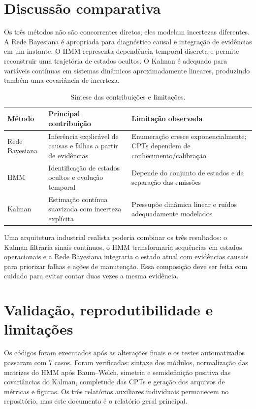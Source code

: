 \documentclass[11pt,a4paper]{article}
\begin{document}
\section{Discussão comparativa}
Os três métodos não são concorrentes diretos; eles modelam incertezas diferentes. A Rede Bayesiana é apropriada para diagnóstico causal e integração de evidências em um instante. O HMM representa dependência temporal discreta e permite reconstruir uma trajetória de estados ocultos. O Kalman é adequado para variáveis contínuas em sistemas dinâmicos aproximadamente lineares, produzindo também uma covariância de incerteza.

\begin{table}[H]\centering
\caption{Síntese das contribuições e limitações.}
\begin{tabularx}{\linewidth}{lXX}
\toprule
Método & Principal contribuição & Limitação observada\\
\midrule
Rede Bayesiana & Inferência explicável de causas e falhas a partir de evidências & Enumeração cresce exponencialmente; CPTs dependem de conhecimento/calibração\\
HMM & Identificação de estados ocultos e evolução temporal & Depende do conjunto de estados e da separação das emissões\\
Kalman & Estimação contínua suavizada com incerteza explícita & Pressupõe dinâmica linear e ruídos adequadamente modelados\\
\bottomrule
\end{tabularx}
\end{table}

Uma arquitetura industrial realista poderia combinar os três resultados: o Kalman filtraria sinais contínuos, o HMM transformaria sequências em estados operacionais e a Rede Bayesiana integraria o estado atual com evidências causais para priorizar falhas e ações de manutenção. Essa composição deve ser feita com cuidado para evitar contar duas vezes a mesma evidência.

\section{Validação, reprodutibilidade e limitações}
Os códigos foram executados após as alterações finais e os testes automatizados passaram com 7 casos. Foram verificadas: sintaxe dos módulos, normalização das matrizes do HMM após Baum--Welch, simetria e semidefinição positiva das covariâncias do Kalman, completude das CPTs e geração dos arquivos de métricas e figuras. Os três relatórios auxiliares individuais permanecem no repositório, mas este documento é o relatório geral principal.
\end{document}
